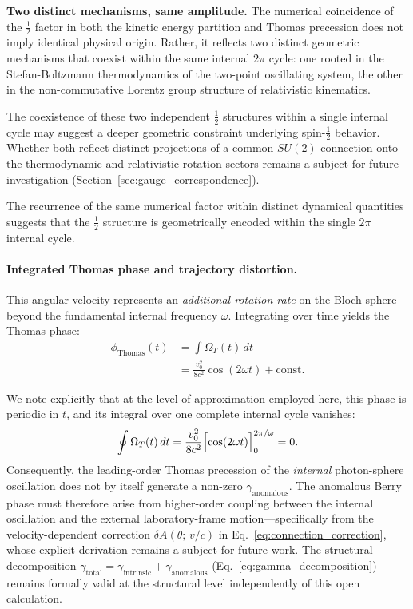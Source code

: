 \documentclass[%
 reprint,
 amsmath,amssymb,
 aps,
 prb,
]{revtex4-2}
\numberwithin{equation}{section}
\theoremstyle{definition}
\theoremstyle{remark}
\begin{document}
\textbf{Two distinct mechanisms, same amplitude.} The numerical coincidence of the $\frac{1}{2}$ factor in both the kinetic energy partition and Thomas precession does not imply identical physical origin. Rather, it reflects two distinct geometric mechanisms that coexist within the same internal $2\pi$ cycle: one rooted in the Stefan-Boltzmann thermodynamics of the two-point oscillating system, the other in the non-commutative Lorentz group structure of relativistic kinematics.

The coexistence of these two independent $\frac{1}{2}$ structures within a single internal cycle may suggest a deeper geometric constraint underlying spin-$\frac{1}{2}$ behavior. Whether both reflect distinct projections of a common $SU(2)$ connection onto the thermodynamic and relativistic rotation sectors remains a subject for future investigation (Section~\ref{sec:gauge_correspondence}).

The recurrence of the same numerical factor within distinct dynamical quantities suggests that the $\frac{1}{2}$ structure is geometrically encoded within the single $2\pi$ internal cycle.

\paragraph{Integrated Thomas phase and trajectory distortion.}
This angular velocity represents an \emph{additional rotation rate} on the Bloch sphere beyond the fundamental internal frequency $\omega$. Integrating over time yields the Thomas phase:
\begin{equation}
\begin{split}
\phi_{\text{Thomas}}(t) &= \int \Omega_T(t)\, dt \\
&= \frac{v_0^2}{8c^2}\cos(2\omega t) + \text{const}.
\end{split}
\label{eq:thomas_phase}
\end{equation}

We note explicitly that at the level of approximation employed here, this phase is periodic in $t$, and its integral over one complete internal cycle vanishes:
\begin{equation}
\oint \Omega_T(t)\,dt
= \frac{v_0^2}{8c^2}\Bigl[\cos(2\omega t)\Bigr]_0^{2\pi/\omega} = 0.
\label{eq:thomas_cycle_zero}
\end{equation}
Consequently, the leading-order Thomas precession of the \emph{internal} photon-sphere oscillation does not by itself generate a non-zero $\gamma_{\text{anomalous}}$. The anomalous Berry phase must therefore arise from higher-order coupling between the internal oscillation and the external laboratory-frame motion---specifically from the velocity-dependent correction $\delta A(\theta;\,v/c)$ in Eq.~\eqref{eq:connection_correction}, whose explicit derivation remains a subject for future work. The structural decomposition $\gamma_{\text{total}} = \gamma_{\text{intrinsic}} + \gamma_{\text{anomalous}}$ (Eq.~\ref{eq:gamma_decomposition}) remains formally valid at the structural level independently of this open calculation.
\end{document}
